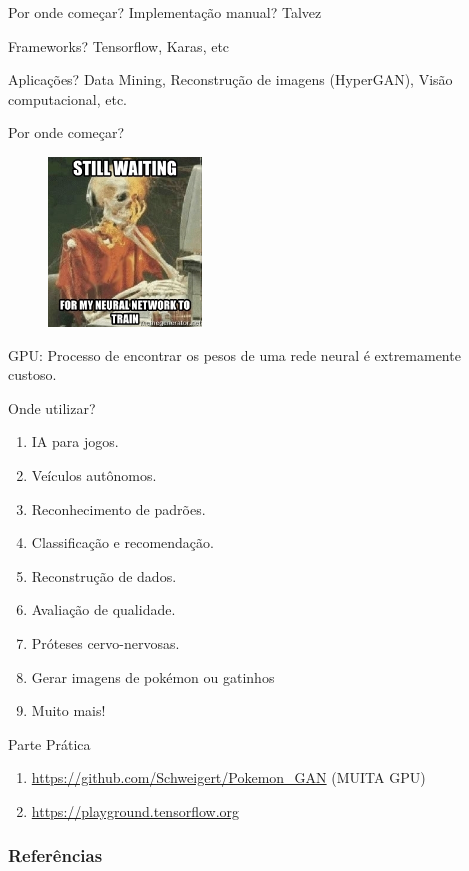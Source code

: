 \documentclass[compress]{beamer}
\begin{document}
\begin{frame}{Por onde começar?}
    Implementação manual? Talvez
    
    Frameworks? Tensorflow, Karas, etc
    
    Aplicações? Data Mining, Reconstrução de imagens (HyperGAN), Visão computacional, etc.
\end{frame}

\begin{frame}{Por onde começar?}
    \begin{figure}[h]
        \includegraphics[height=4.5cm]{img/waiting.jpg}
    \end{figure}
    
    GPU: Processo de encontrar os pesos de uma rede neural é extremamente custoso.
\end{frame}

\begin{frame}{Onde utilizar?}
    \begin{enumerate}
        \item IA para jogos.
        \item Veículos autônomos.
        \item Reconhecimento de padrões.
        \item Classificação e recomendação.
        \item Reconstrução de dados.
        \item Avaliação de qualidade.
        \item Próteses cervo-nervosas.
        \item Gerar imagens de pokémon ou gatinhos
        \item Muito mais!
    \end{enumerate}
\end{frame}

\begin{frame}{Parte Prática}
    \begin{enumerate}
        \item \url{https://github.com/Schweigert/Pokemon_GAN} (MUITA GPU)
        \item
        \url{https://playground.tensorflow.org}
    \end{enumerate}
\end{frame}

\begin{frame}[allowframebreaks]
\frametitle{Referências}


\end{frame}
\end{document}
